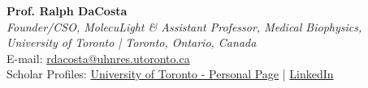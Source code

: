 \documentclass[a4paper,9pt]{extarticle}
\begin{document}
\begin{minipage}{1\textwidth}
\setlength{\parindent}{15pt} %
	\noindent
	\textbf{Prof. Ralph DaCosta}\\
	\textit{Founder/CSO, MolecuLight \& Assistant Professor, Medical Biophysics, University of Toronto | Toronto, Ontario, Canada}\\
	E-mail: \href{mailto:rdacosta@uhnres.utoronto.ca}{rdacosta@uhnres.utoronto.ca}\\
	Scholar Profiles: \href{https://medbio.utoronto.ca/faculty/dacosta}{University of Toronto - Personal Page} | \href{https://www.linkedin.com/in/dr-ralph-dacosta-474b41127/}{LinkedIn}\\ \\
\end{minipage}
\end{document}
